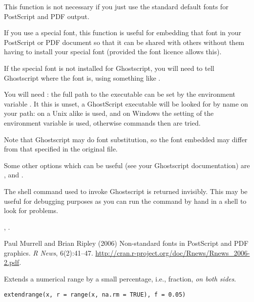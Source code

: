 %
\begin{Details}\relax
This function is not necessary if you just use the standard
default fonts for PostScript and PDF output.

If you use a special font, this function is useful for
embedding that font in your PostScript or PDF document
so that it can be shared with others without them having
to install your special font (provided the font licence allows this).

If the special font is not installed for Ghostscript,
you will need to tell Ghostscript where the font is, using
something like .

You will need : the full path to the executable can
be set by the environment variable . It this is
unset, a GhostScript executable will be looked for by name on your
path: on a Unix alike  is used, and on Windows the setting
of the environment variable  is used, otherwise commands
 then  are tried.

Note that Ghostscript may do font substitution, so the font embedded
may differ from that specified in the original file.

Some other options which can be useful (see your Ghostscript
documentation) are ,
 and  .
\end{Details}
%
\begin{Value}
The shell command used to invoke Ghostscript is returned
invisibly. This may be useful for debugging purposes as
you can run the command by hand in a shell to look for problems.
\end{Value}
%
\begin{SeeAlso}\relax
{},
.

Paul Murrell and Brian Ripley (2006) Non-standard fonts in PostScript
and PDF graphics. \emph{R News}, 6(2):41--47.
\url{http://cran.r-project.org/doc/Rnews/Rnews_2006-2.pdf}.
\end{SeeAlso}
%
\begin{Description}\relax
Extends a numerical range by a small percentage, i.e., fraction,
\emph{on both sides}.
\end{Description}
%
\begin{Usage}
\begin{verbatim}
extendrange(x, r = range(x, na.rm = TRUE), f = 0.05)
\end{verbatim}
\end{Usage}
